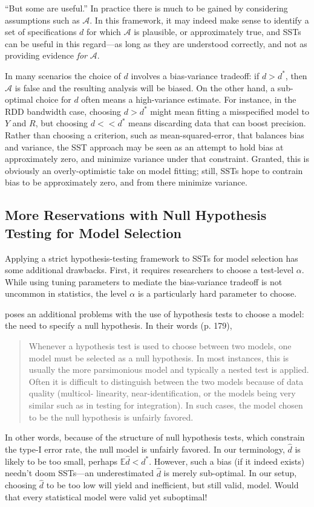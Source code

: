\documentclass[12pt]{article}\usepackage[]{graphicx}\usepackage[]{color}
\newcommand{\dstar}{d^*}
\newcommand{\EE}{\mathbb{E}}
\begin{document}
``But some are useful.''
In practice there is much to be gained by considering assumptions such
as $\mathcal{A}$.
In this framework, it may indeed make sense to identify a set of
specifications $d$ for which $\mathcal{A}$ is plausible, or
approximately true, and
SSTs can be useful in this regard---as long as they are understood
correctly, and not as providing evidence \emph{for} $\mathcal{A}$.

In many scenarios the choice of $d$ involves a bias-variance tradeoff:
if $d>\dstar$, then $\mathcal{A}$ is false and the resulting analysis
will be biased.
On the other hand, a sub-optimal choice for $d$ often means a
high-variance estimate.
For instance, in the RDD bandwidth case, choosing $d>\dstar$ might mean
fitting a misspecified model to $Y$ and $R$, but choosing $d<<\dstar$
means discarding data that can boost precision.
Rather than choosing a criterion, such as mean-squared-error, that
balances bias and variance, the SST approach may be seen as an attempt to hold
bias at approximately zero, and minimize variance under that
constraint.
Granted, this is obviously an overly-optimistic take on model fitting;
still, SSTs hope to contrain bias to be approximately zero, and from there
minimize variance.


\subsection{More Reservations with Null Hypothesis Testing for Model
  Selection}

Applying a strict hypothesis-testing framework to SSTs for model
selection has some additional drawbacks.
First, it requires researchers to choose a test-level $\alpha$. While
using tuning parameters to mediate the bias-variance tradeoff is not
uncommon in statistics, the level $\alpha$ is a particularly hard
parameter to choose.

\citet{granger} poses an additional problems with the use of
hypothesis tests to choose a model: the need to specify a null
hypothesis. In their words (p. 179),
\begin{quote}
Whenever a hypothesis test is used to choose between two models, one
model must be selected as a null hypothesis. In most instances, this
is usually the more parsimonious model and typically a nested test is
applied. Often it is difficult to distinguish between the two models
because of data quality (multicol- linearity, near-identification, or
the models being very similar such as in testing for integration). In
such cases, the model chosen to be the null hypothesis is unfairly
favored.
\end{quote}
In other words, because of the structure of null hypothesis tests,
which constrain the type-I error rate, the null model is unfairly
favored.
In our terminology, $\hat{d}$ is likely to be too small, perhaps $\EE
\hat{d}<\dstar$.
However, such a bias (if it indeed exists) needn't doom SSTs---an
underestimated $\hat{d}$ is merely sub-optimal. In our setup, choosing
$\hat{d}$ to be too low will yield and inefficient, but still valid,
model.
Would that every statistical model were valid yet suboptimal!
\end{document}
